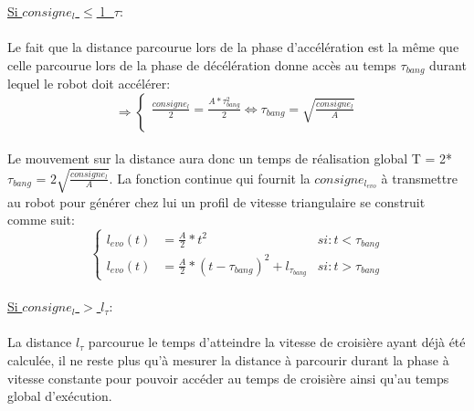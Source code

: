 \documentclass[a4paper,11pt]{article}
\begin{document}
\underline{Si $consigne_{l}$ $\leq$ l_{$\tau$}}:\\\\
Le fait que la distance parcourue lors de la phase d'accélération est la même que celle parcourue lors de la phase de décélération donne accès au temps $\tau_{bang}$ durant lequel le robot doit accélérer:
\begin{equation*}
    \Rightarrow\left\{
        \begin{aligned}
        \frac{consigne_{l}}{2} = \frac{A*\tau_{bang}^2}{2} \Leftrightarrow \tau_{bang} = \sqrt{\frac{consigne_{l}}{A}}\\
           \end{aligned}
    \right.
\end{equation*}\\
Le mouvement sur la distance aura donc un temps de réalisation global T = 2*$\tau_{bang}$ = $2\sqrt{\frac{consigne_{l}}{A}}$. La fonction continue qui fournit la $consigne_{l_{evo}}$ à transmettre au robot pour générer chez lui un profil de vitesse triangulaire se construit comme suit:
\begin{equation*}
    \left\{
        \begin{aligned}
        l_{evo}(t) & = \frac{A}{2}*t^2 &si : t<\tau_{bang}\\
        l_{evo}(t) & = \frac{A}{2}*(t-\tau_{bang})^2 + l_{\tau_{bang}} &si : t>\tau_{bang}
        \end{aligned}
    \right.
\end{equation*}\\

\underline{Si $consigne_{l}$ $>$ $l_{\tau}$}:\\\\
La distance $l_{\tau}$ parcourue le temps d'atteindre la vitesse de croisière ayant déjà été calculée, il ne reste plus qu'à mesurer la distance à parcourir durant la phase à vitesse constante pour pouvoir accéder au temps de croisière ainsi qu'au temps global d'exécution.
\end{document}
